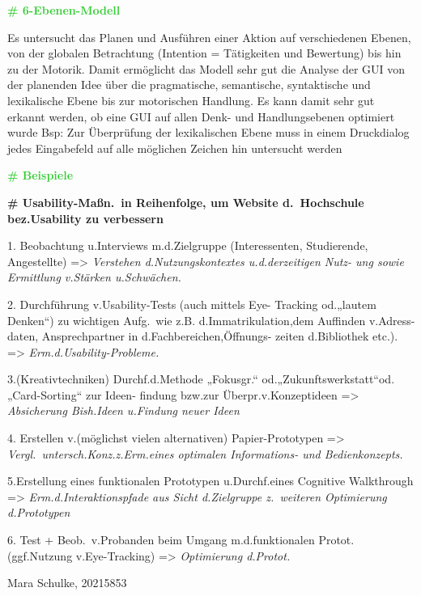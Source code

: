 \documentclass{article}
\begin{document}
\begin{multicols}{3}
\begin{flushleft}
\begin{tiny}
			\textcolor{LimeGreen}{\textbf{\scriptsize{\# 6-Ebenen-Modell}}}

			Es untersucht das Planen und Ausführen einer Aktion auf
			verschiedenen Ebenen, von der globalen Betrachtung (Intention =
			Tätigkeiten und Bewertung) bis hin zu der Motorik. Damit
			ermöglicht das Modell sehr gut die Analyse der GUI von der
			planenden Idee über die pragmatische, semantische, syntaktische
			und lexikalische Ebene bis zur motorischen Handlung. Es kann
			damit sehr gut erkannt werden, ob eine GUI auf allen Denk- und
			Handlungsebenen optimiert wurde Bsp: Zur Überprüfung der
			lexikalischen Ebene muss in einem Druckdialog jedes Eingabefeld
			auf alle möglichen Zeichen hin untersucht werden

			\textcolor{LimeGreen}{\textbf{\scriptsize{\# Beispiele}}}

			\textbf{\# Usability-Maßn.\ in Reihenfolge, um Website d.\
				Hochschule bez.Usability zu verbessern}

			1. Beobachtung u.Interviews m.d.Zielgruppe (Interessenten,
			Studierende, Angestellte) => \textit{Verstehen d.Nutzungskontextes
			u.d.derzeitigen Nutz- ung sowie Ermittlung v.Stärken u.Schwächen.}

			2. Durchführung v.Usability-Tests (auch mittels Eye-
			Tracking od.„lautem Denken“) zu wichtigen Aufg.\
			wie z.B. d.Immatrikulation,dem Auffinden v.Adress-
			daten, Ansprechpartner in d.Fachbereichen,Öffnungs-
			zeiten d.Bibliothek etc.). => \textit{Erm.d.Usability-Probleme.}

			3.(Kreativtechniken) Durchf.d.Methode „Fokusgr.“
			od.„Zukunftswerkstatt“od.„Card-Sorting“ zur Ideen-
			findung bzw.zur Überpr.v.Konzeptideen => \textit{Absicherung
			Bish.Ideen u.Findung neuer Ideen}

			4. Erstellen v.(möglichst vielen alternativen) Papier-Prototypen =>
			\textit{Vergl.\ untersch.Konz.z.Erm.eines optimalen Informations-
			und Bedienkonzepts.}

			5.Erstellung eines funktionalen Prototypen u.Durchf.eines Cognitive
			Walkthrough => \textit{Erm.d.Interaktionspfade aus Sicht
			d.Zielgruppe z.\ weiteren Optimierung d.Prototypen}

			6. Test + Beob.\ v.Probanden beim Umgang m.d.funktionalen Protot.
			(ggf.Nutzung v.Eye-Tracking) => \textit{Optimierung d.Protot.}

			Mara Schulke, 20215853
		\end{tiny}
	\end{flushleft}
\end{multicols}
\end{document}
